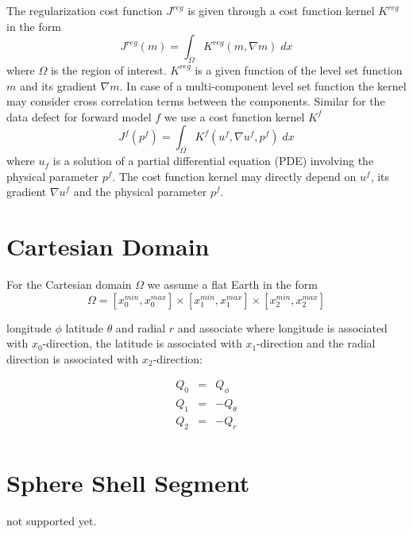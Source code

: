 The regularization cost function $J^{reg}$ is given through a cost function
kernel $K^{reg}$ in the form
\begin{equation}\label{REF:EQU:INTRO 2a}
J^{reg}(m) = \int_{\Omega} K^{reg}(m, \nabla m) \; dx
\end{equation} 
where $\Omega$ is the region of interest. $K^{reg}$ is a given function of the
level set function $m$ and its gradient $\nabla m$.
In case of a multi-component level set function the kernel may consider cross
correlation terms between the components.
Similar for the data defect for forward model $f$ we use a cost function kernel $K^{f}$ 
\begin{equation}\label{REF:EQU:INTRO 2b}
J^{f}(p^f) = \int_{\Omega} K^{f}(u^f, \nabla u^f,p^f) \; dx
\end{equation} 
where $u_f$ is a solution of a partial differential equation (PDE) involving
the physical parameter $p^f$.
The cost function kernel may directly depend on $u^f$, its gradient
$\nabla u^f$ and the physical parameter $p^f$.


\section{Cartesian Domain}
For the Cartesian domain $\Omega$ we assume a flat Earth in the form
\begin{equation} \label{REF:EQU:INTRO 8}
\Omega = [x^{min}_0, x^{max}_0] \times
 [x^{min}_1, x^{max}_1] \times
 [x^{min}_2, x^{max}_2] 
\end{equation} 

longitude $\phi$ latitude $\theta$ and radial $r$
and associate where longitude is associated with $x_0$-direction,
the latitude is associated with $x_1$-direction and the radial direction is associated with $x_2$-direction: 

 \begin{equation}\label{REF:EQU:INTRO 9}
\begin{array}{rcl}
Q_0  & = &  Q_{\phi} \\
Q_1  & = & -Q_{\theta} \\
Q_2  & = & -Q_r \\
\end{array}
\end{equation}

\section{Sphere Shell Segment}
not supported yet.

 
